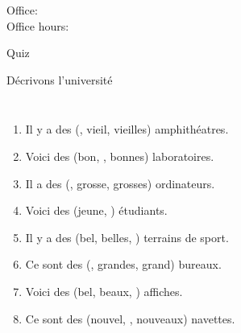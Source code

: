 \documentclass{beamer}
\subtitle[Adjectifs prénominaux au pluriel]{Les adjectifs prénominaux au pluriel}
\begin{document}
  \begin{frame}
    \titlepage
    \tiny{Office: \\
          Office hours: }
  \end{frame}

  \begin{frame}{}
    \begin{center}
      \Large Quiz
    \end{center}
  \end{frame}

  \begin{frame}{Décrivons l'université}
    \begin{columns}
        {\scriptsize
        \begin{enumerate}
          \item Il y a des (, vieil, vieilles) amphithéatres.
          \item<3-> Voici des (bon, , bonnes) laboratoires.
          \item<5-> Il a des (, grosse, grosses) ordinateurs.
          \item<7-> Voici des (jeune, ) étudiants.
          \item<9-> Il y a des (bel, belles, ) terrains de sport.
          \item<11-> Ce sont des (, grandes, grand) bureaux.
          \item<13-> Voici des (bel, beaux, ) affiches.
          \item<15-> Ce sont des (nouvel, , nouveaux) navettes.
        \end{enumerate}
        }
        \begin{minipage}[c][0.6\textheight]{\linewidth}
          \begin{center}
\end{center}
\end{minipage}
\end{columns}
\end{frame}
\end{document}
